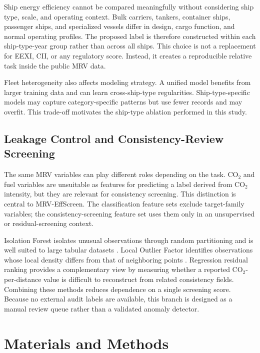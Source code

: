 \documentclass[preprints,article,submit,pdftex,oneauthor]{Definitions/mdpi}
\begin{document}
Ship energy efficiency cannot be compared meaningfully without considering ship type, scale, and operating context. Bulk carriers, tankers, container ships, passenger ships, and specialized vessels differ in design, cargo function, and normal operating profiles. The proposed label is therefore constructed within each ship-type-year group rather than across all ships. This choice is not a replacement for EEXI, CII, or any regulatory score. Instead, it creates a reproducible relative task inside the public MRV data.

Fleet heterogeneity also affects modeling strategy. A unified model benefits from larger training data and can learn cross-ship-type regularities. Ship-type-specific models may capture category-specific patterns but use fewer records and may overfit. This trade-off motivates the ship-type ablation performed in this study.

\subsection{Leakage Control and Consistency-Review Screening}

The same MRV variables can play different roles depending on the task. CO$_2$ and fuel variables are unsuitable as features for predicting a label derived from CO$_2$ intensity, but they are relevant for consistency screening. This distinction is central to MRV-EffScreen. The classification feature sets exclude target-family variables; the consistency-screening feature set uses them only in an unsupervised or residual-screening context.

Isolation Forest isolates unusual observations through random partitioning and is well suited to large tabular datasets \cite{liu2008isolation_forest}. Local Outlier Factor identifies observations whose local density differs from that of neighboring points \cite{breunig2000lof}. Regression residual ranking provides a complementary view by measuring whether a reported CO$_2$-per-distance value is difficult to reconstruct from related consistency fields. Combining these methods reduces dependence on a single screening score. Because no external audit labels are available, this branch is designed as a manual review queue rather than a validated anomaly detector.

\section{Materials and Methods}
\end{document}
